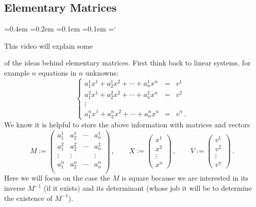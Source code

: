 
\subsection*{Elementary Matrices}

{\ttfamily
{}\font=0.4em
\font=0.2em
\font=0.1em
\font=0.1em
\hyphenchar\font=`\-


\hypertarget{scripts_elementary_matrices_explanation}{This video will explain some} 
of the ideas behind elementary matrices. First think back to linear systems, for example
$n$ equations in $n$ unknowns:
$$
\left\{
\begin{array}{ccc}
a^1_1 x^1 + a^1_2 x^2+\cdots +a^1_n x^n &=&v^1\\[1mm]
a^2_1 x^1 + a^2_2 x^2+\cdots +a^2_n x^n &=&v^2\\[1mm]
\vdots &&\\[2mm]
a^n_1 x^1 + a^n_2 x^2+\cdots +a^n_n x^n &=&v^n\, .
\end{array}\right .
$$
We know it is helpful to store the above information with matrices and vectors
$$
M:=\begin{pmatrix}
a^1_1&a^1_2&\cdots& a^1_n\\
a^2_1&a^2_2&\cdots& a^2_n\\
\vdots&\vdots&&\vdots\\
a^n_1&a^n_2&\cdots& a^n_n\\
\end{pmatrix}\, ,\qquad
X:=\begin{pmatrix}x^1\\x^2\\\vdots\\ x^n\end{pmatrix}\, ,\qquad
V:=\begin{pmatrix}v^1\\v^2\\\vdots\\v^n\end{pmatrix}\, .
$$
Here we will focus on the case the $M$ is square because we are interested in its inverse $M^{-1}$ (if it exists) and its determinant (whose job it will be to determine the existence of $M^{-1}$).

}
